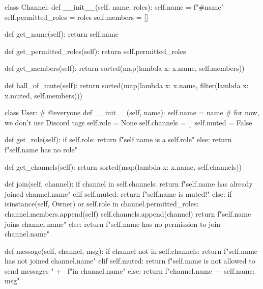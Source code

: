 \begin{python}
class Channel:
    def __init__(self, name, roles):
        self.name = f"#{name}"
        self.permitted_roles = roles
        self.members = []

    def get_name(self):
        return self.name

    def get_permitted_roles(self):
        return self.permitted_roles

    def get_members(self):
        return sorted(map(lambda x: x.name, self.members))

    def hall_of_mute(self):
        return sorted(map(lambda x: x.name,
               filter(lambda x: x.muted, self.members)))

class User: # @everyone
    def __init__(self, name):
        self.name = name # for now, we don't use Discord tags
        self.role = None
        self.channels = []
        self.muted = False

    def get_role(self):
        if self.role:
            return f"{self.name} is a {self.role}"
        else:
            return f"{self.name} has no role"
        
    def get_channels(self):
        return sorted(map(lambda x: x.name, self.channels))

    def join(self, channel):
        if channel in self.channels:
            return f"{self.name} has already joined {channel.name}"
        elif self.muted:
            return f"{self.name} is muted!"
        else:
            if isinstance(self, Owner) or self.role in channel.permitted_roles:
                channel.members.append(self)
                self.channels.append(channel)
                return f"{self.name} joins {channel.name}"
            else:
                return f"{self.name} has no permission to join {channel.name}"

    def message(self, channel, msg):
        if channel not in self.channels:
            return f"{self.name} has not joined {channel.name}"
        elif self.muted:
            return f"{self.name} is not allowed to send messages " + \
                   f"in {channel.name}"
        else:
            return f"{channel.name} --- {self.name}: {msg}"


\end{python}
